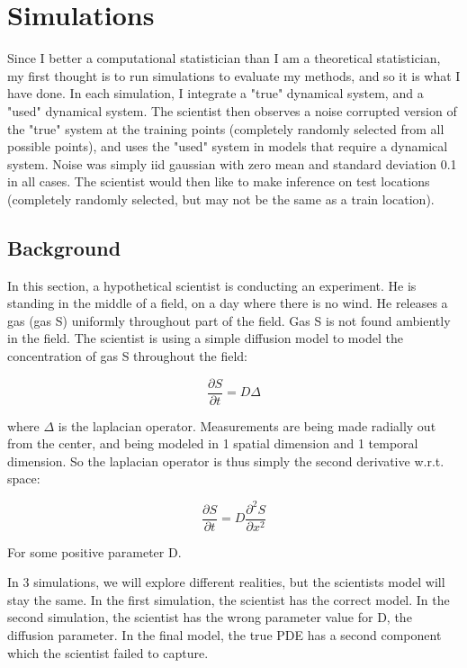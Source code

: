 \documentclass{article}
\begin{document}
	\section{Simulations}
	
	\label{sims}
	
	Since I better a computational statistician than I am a theoretical statistician, my first thought is to run simulations to evaluate my methods, and so it is what I have done. In each simulation, I integrate a "true" dynamical system, and a "used" dynamical system. The scientist then observes a noise corrupted version of the "true" system at the training points (completely randomly selected from all possible points), and uses the "used" system in models that require a dynamical system. Noise was simply iid gaussian with zero mean and standard deviation 0.1 in all cases. The scientist would then like to make inference on test locations (completely randomly selected, but may not be the same as a train location).
	
	
	\subsection{Background}
	
	In this section, a hypothetical scientist is conducting an experiment. He is standing in the middle of a field, on a day where there is no wind. He releases a gas (gas S) uniformly throughout part of the field. Gas S is not found ambiently in the field. The scientist is using a simple diffusion model to model the concentration of gas S throughout the field:
	
	$$\frac{\partial S}{\partial t} = D \Delta$$
	
	where $\Delta$ is the laplacian operator. Measurements are being made radially out from the center, and being modeled in 1 spatial dimension and 1 temporal dimension. So the laplacian operator is thus simply the second derivative w.r.t. space:
	
	$$\frac{\partial S}{\partial t} = D \frac{\partial^2 S}{\partial x^2}$$
	
	For some positive parameter D.
	
	In 3 simulations, we will explore different realities, but the scientists model will stay the same. In the first simulation, the scientist has the correct model. In the second simulation, the scientist has the wrong parameter value for D, the diffusion parameter. In the final model, the true PDE has a second component which the scientist failed to capture.
	
\end{document}

